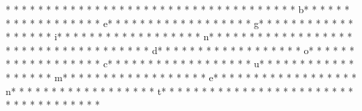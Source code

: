 * * *  * * *  * * *  *  * * *  *  * * *  * %
* * *  * * *  * * *  *  * * *  *  * * *  * b* * *  * * *  * * *  *  * * *  *  * * *  * e* * *  * * *  * * *  *  * * *  *  * * *  * g* * *  * * *  * * *  *  * * *  *  * * *  * i* * *  * * *  * * *  *  * * *  *  * * *  * n* * *  * * *  * * *  *  * * *  *  * * *  * {* * *  * * *  * * *  *  * * *  *  * * *  * d* * *  * * *  * * *  *  * * *  *  * * *  * o* * *  * * *  * * *  *  * * *  *  * * *  * c* * *  * * *  * * *  *  * * *  *  * * *  * u* * *  * * *  * * *  *  * * *  *  * * *  * m* * *  * * *  * * *  *  * * *  *  * * *  * e* * *  * * *  * * *  *  * * *  *  * * *  * n* * *  * * *  * * *  *  * * *  *  * * *  * t* * *  * * *  * * *  *  * * *  *  * * *  * }* * *  * * *  * * *  *  * * *  *  * * *  * 
